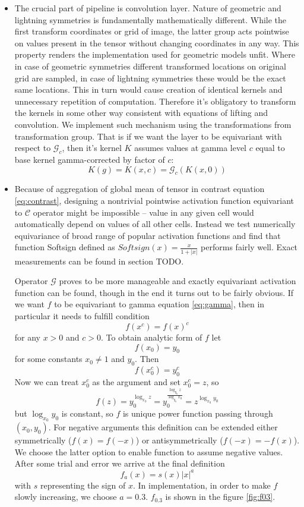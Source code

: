 \begin{itemize}
\item
The crucial part of pipeline is convolution layer. Nature of geometric
and lightning symmetries is fundamentally mathematically different. While
the first
transform coordinates or grid of image, the latter group acts pointwise on
values present in the tensor without changing coordinates in any way.
This property renders the implementation used for geometric models unfit.
Where in case of geometric symmetries different transformed locations
on original grid are sampled, in case of lightning symmetries these would be the
exact same locations. This in turn would cause creation of identical kernels and
unnecessary repetition of computation. Therefore it's obligatory to transform the
kernels in some other way consistent with equations of lifting and convolution.
We implement such mechanism using the transformations from transformation group.
That is if we want the layer to be equivariant with respect to
$\mathcal{G}_c$, then it's kernel $K$ assumes values at gamma level $c$ equal to
base kernel gamma-corrected by factor of $c$:
\begin{equation}
    K(g) = K(x,c) = \mathcal{G}_c(K(x,0))
\end{equation}

\item Because of aggregation of global mean of tensor in contrast equation \ref{eq:contrast},
    designing a nontrivial pointwise activation function equivariant to
    $\mathcal{C}$ operator
    might be impossible -- value in any given cell would automatically depend on
    values of all other cells. Instead we test numerically equivariance of broad
    range of popular activation functions and find that function Softsign
    defined as $\mathit{Softsign}(x) = \frac{x}{1+|x|}$ performs fairly well.
    Exact measurements can be found in section TODO.

    Operator $\mathcal{G}$ proves to be more manageable and exactly equivariant
    activation function can be found, though in the end it turns out to be
    fairly obvious. If we want $f$ to be equivariant to gamma equation \ref{eq:gamma}, then in
    particular it needs to fulfill condition $$f\left(x^c\right) =
    f\left(x\right)^c$$
    for any $x>0$ and
    $c > 0$. To obtain analytic form of $f$
    let $$f(x_0)=y_0$$ for some constants $x_0 \neq 1$ and $y_0$.
    Then $$f\left(x_0^c\right) = y_0^c$$ Now we can treat $x_0^c$ as the argument and set
    $x_0^c = z$, so $$f(z) = y_0^{\log_{x_0}z} =
    y_0^\frac{\log_{y_0}z}{\log_{y_0}{x_0}} = z^{\log_{x_0}{y_0}}$$
    but $\log_{x_0}{y_0}$ is constant, so $f$ is unique power function passing
    through $\left(x_0, y_0\right)$. For negative arguments this definition can
    be extended either symmetrically ($f(x)=f(-x)$) or antisymmetrically ($f(-x)
    = -f(x)$). We choose the latter option to enable function to assume negative
    values.
    After some trial and error we arrive at the final definition $$f_a(x)
    = s(x)|x|^a$$ with $s$ representing the sign of $x$.
    In implementation, in order to make $f$ slowly increasing, we
    choose $a=0.3$. $f_{0.3}$ is shown in the figure \ref{fig:f03}.


\end{itemize}
